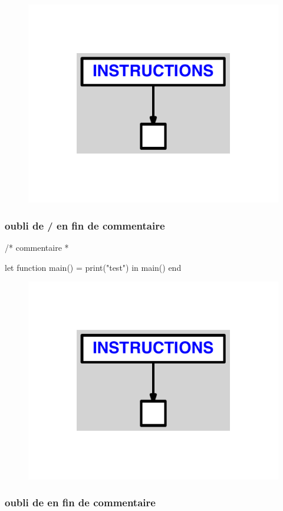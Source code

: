 \documentclass{article}
\begin{document}
\begin{figure}[H]\centering\includegraphics[max width=\textwidth]{ast/ast_147.pdf}\end{figure}\subsubsection{oubli de / en fin de commentaire}
\begin{verbatimtab}
/* commentaire *

let
	function main() = print("test")
in main() end
\end{verbatimtab}
\begin{figure}[H]\centering\includegraphics[max width=\textwidth]{ast/ast_148.pdf}\end{figure}\subsubsection{oubli de  en fin de commentaire}
\end{document}
